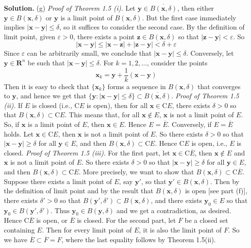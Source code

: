 \documentclass[12pt]{article}
\theoremstyle{definition}
\begin{document}
\smallskip
\noindent\textbf{Solution.}\quad
(g) \textit{Proof of Theorem 1.5 (i).} Let $\mathbf{y}\in\overline{B(\mathbf{x},\delta)}$, then either $\mathbf{y}\in B(\mathbf{x},\delta)$ or $\mathbf{y}$ is a limit point of $B(\mathbf{x},\delta)$. But the first case immediately implies $\left\vert\mathbf{x}-\mathbf{y}\right\vert\le\delta$, so it suffices to consider the second case. By the definition of limit point, given $\varepsilon>0$, there exists a point $\mathbf{z}\in B(\mathbf{x},\delta)$ so that $\left\vert\mathbf{z}-\mathbf{y}\right\vert<\varepsilon$. So
$$
\left\vert\mathbf{x}-\mathbf{y}\right\vert
\le \left\vert\mathbf{x}-\mathbf{z}\right\vert+\left\vert\mathbf{z}-\mathbf{y}\right\vert
<\delta+\varepsilon
$$
Since $\varepsilon$ can be arbitrarily small, we conclude that $\left\vert\mathbf{x}-\mathbf{y}\right\vert\le\delta$. Conversely, let $\mathbf{y}\in\mathbf{R}^n$ be such that $\left\vert\mathbf{x}-\mathbf{y}\right\vert\le\delta$. For $k=1,2,\ldots$, consider the points
$$
\mathbf{x}_k=\mathbf{y}+\frac{1}{k}(\mathbf{x}-\mathbf{y})
$$
Then it is easy to check that $\{\mathbf{x}_k\}$ forms a sequence in $B(\mathbf{x},\delta)$ that converges to $\mathbf{y}$, and hence we get that $\{\mathbf{y}:\left\vert\mathbf{x}-\mathbf{y}\right\vert\le\delta\}\subset\overline{B(\mathbf{x},\delta)}$.
\textit{Proof of Theorem 1.5 (ii).} If $E$ is closed (i.e., $\mathrm{C}E$ is open), then for all $\mathbf{x}\in\mathrm{C}E$, there exists $\delta>0$ so that $B(\mathbf{x},\delta)\subset\mathrm{C}E$. This means that, for all $\mathbf{x}\notin E$, $\mathbf{x}$ is not a limit point of $E$. So, if $\mathbf{x}$ is a limit point of $E$, then $\mathbf{x}\in E$. Hence $E=\overline{E}$. Conversely, if $E=\overline{E}$ holds. Let $\mathbf{x}\in\mathrm{C}E$, then $\mathbf{x}$ is not a limit point of $E$. So there exists $\delta>0$ so that $\left\vert\mathbf{x}-\mathbf{y}\right\vert\ge\delta$ for all $\mathbf{y}\in E$, and then $B(\mathbf{x},\delta)\subset \mathrm{C}E$. Hence $\mathrm{C}E$ is open, i.e., $E$ is closed.
\textit{Proof of Theorem 1.5 (iii).} For the first part, let $\mathbf{x}\in\mathrm{C}\overline{E}$, then $\mathbf{x}\notin E$ and $\mathbf{x}$ is not a limit point of $E$. So there exists $\delta>0$ so that $\left\vert\mathbf{x}-\mathbf{y}\right\vert\ge\delta$ for all $\mathbf{y}\in E$, and then $B(\mathbf{x},\delta)\subset \mathrm{C}E$. More precisely, we want to show that $B(\mathbf{x},\delta)\subset \mathrm{C}\overline{E}$. Suppose there exists a limit point of $E$, say $\mathbf{y}'$, so that $\mathbf{y}'\in B(\mathbf{x},\delta)$. Then by the definition of limit point and by the result that $B(\mathbf{x},\delta)$ is open [see part (f)], there exists $\delta'>0$ so that $B(\mathbf{y}',\delta')\subset B(\mathbf{x},\delta)$, and there exists $\mathbf{y}_0\in E$ so that $\mathbf{y}_0\in B(\mathbf{y}',\delta')$. Thus $\mathbf{y}_0\in B(\mathbf{y},\delta)$ and we get a contradiction, as desired. Hence $\mathrm{C}\overline{E}$ is open, or $\overline{E}$ is closed. For the second part, let $F$ be a closed set containing $E$. Then for every limit point of $E$, it is also the limit point of $F$. So we have $\overline{E}\subset \overline{F}=F$, where the last equality follows by Theorem 1.5(ii).
\end{document}
